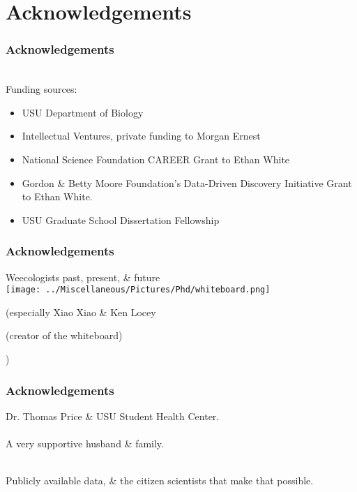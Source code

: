 \documentclass[14pt]{beamer}
\begin{document}
\section{Acknowledgements}
\begin{frame}[t]{}
\frametitle{Acknowledgements}
~\\ %
\small{Funding sources:}
\begin{small}
\begin{itemize}
\item USU Department of Biology
\item Intellectual Ventures, private funding to Morgan Ernest
\item National Science Foundation CAREER Grant to Ethan White
\item Gordon \& Betty Moore Foundation's Data-Driven Discovery Initiative Grant to Ethan White.
\item USU Graduate School Dissertation Fellowship
\end{itemize}
\end{small}
\end{frame}

\begin{frame}{}
\frametitle{Acknowledgements}
Weecologists past, present, \& future\\
\texttt{[image: ../Miscellaneous/Pictures/Phd/whiteboard.png]}
\begin{small}
(especially Xiao Xiao \& Ken Locey \begin{tiny}(creator of the whiteboard)\end{tiny})
\end{small}
\end{frame}

\begin{frame}[t]{}
\frametitle{Acknowledgements}
Dr. Thomas Price \& USU Student Health Center.\\
~\\
A very supportive husband \& family.\\
~\\
\begin{Large}
Publicly available data, \& the citizen scientists that make that possible.\\
\end{Large}
\end{frame}
\end{document}
